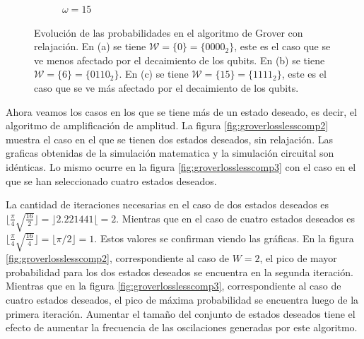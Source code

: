 \begin{figure}[H]
\begin{subfigure}[m]{0.49\textwidth}
        \caption{$\omega = 15$}
        \label{fig:groverloss1111}
    \end{subfigure}
    \caption[Evolución de las probabilidades en el algoritmo de Grover con relajación, $\mathcal{W} = \{0\}$]{Evolución de las probabilidades en el algoritmo de Grover con relajación. En (a) se tiene $\mathcal{W} = \{0\} = \{0000_2\}$, este es el caso que se ve menos afectado por el decaimiento de los qubits. En (b) se tiene $\mathcal{W} = \{6\} = \{0110_2\}$. En (c) se tiene $\mathcal{W} = \{15\} = \{1111_2\}$, este es el caso que se ve más afectado por el decaimiento de los qubits.}
    \label{fig:groverloss}
\end{figure}

Ahora veamos los casos en los que se tiene más de un estado deseado, es decir, el algoritmo de amplificación de amplitud. La figura \ref{fig:groverlosslesscomp2} muestra el caso en el que se tienen dos estados deseados, sin relajación. Las graficas obtenidas de la simulación matematica y la simulación circuital son idénticas. Lo mismo ocurre en la figura \ref{fig:groverlosslesscomp3} con el caso en el que se han seleccionado cuatro estados deseados.

La cantidad de iteraciones necesarias en el caso de dos estados deseados es $\lfloor \frac{\pi}{4} \sqrt{\frac{16}{2}} \rfloor = \rfloor 2.221441 \lfloor = 2$. Mientras que en el caso de cuatro estados deseados es $\lfloor \frac{\pi}{4} \sqrt{\frac{16}{4}} \rfloor = \lfloor \pi/2 \rfloor = 1$. Estos valores se confirman viendo las gráficas. En la figura \ref{fig:groverlosslesscomp2}, correspondiente al caso de $W = 2$, el pico de mayor probabilidad para los dos estados deseados se encuentra en la segunda iteración. Mientras que en la figura \ref{fig:groverlosslesscomp3}, correspondiente al caso de cuatro estados deseados, el pico de máxima probabilidad se encuentra luego de la primera iteración. Aumentar el tamaño del conjunto de estados deseados tiene el efecto de aumentar la frecuencia de las oscilaciones generadas por este algoritmo.

